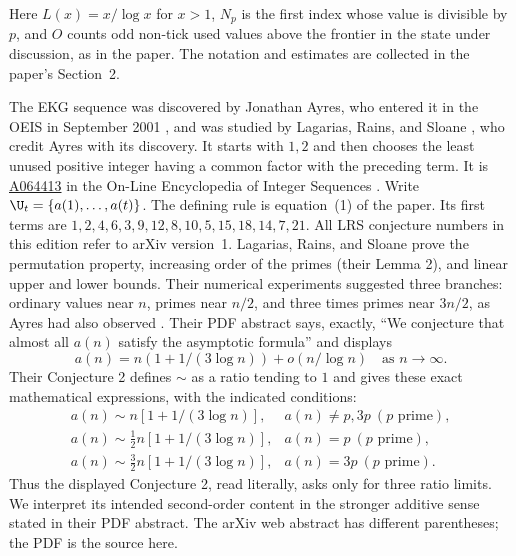 Here $L(x)=x/\log x$ for $x>1$, $N_p$ is the first index whose
value is divisible by $p$, and $O$ counts odd non-tick used values
above the frontier in the state under discussion, as in the paper.
The notation and estimates are collected in the paper's Section~2.

The EKG sequence was discovered by Jonathan Ayres, who entered it in
the OEIS in September 2001 \cite{oeis}, and was studied by
Lagarias, Rains, and Sloane \cite{lrs}, who credit Ayres with its
discovery. It starts with $1,2$ and then chooses the least unused positive
integer having a common factor with the preceding term. It is
\href{https://oeis.org/A064413}{A064413} in the On-Line Encyclopedia
of Integer Sequences \cite{oeis}. Write $\U_t=\{a(1),\ldots,a(t)\}$.
The defining rule is equation~(1) of the paper.
Its first terms are $1,2,4,6,3,9,12,8,10,5,15,18,14,7,21$.
All LRS conjecture numbers in this edition refer to arXiv version~1.
Lagarias, Rains, and Sloane prove the permutation property, increasing
order of the primes (their Lemma 2), and linear upper and lower bounds.
Their numerical experiments suggested three branches: ordinary values
near $n$, primes near $n/2$, and three times primes near $3n/2$, as Ayres
had also observed \cite[Section~4]{lrs}.
Their PDF abstract says, exactly, ``We conjecture that almost all
$a(n)$ satisfy the asymptotic formula'' and displays
\[
 a(n)=n(1+1/(3\log n))+o(n/\log n)\quad\text{as }n\to\infty.
\]
Their Conjecture 2 defines $\sim$ as a ratio tending to $1$ and gives
these exact mathematical expressions, with the indicated conditions:
\[
\begin{array}{ll}
 a(n)\sim n[1+1/(3\log n)],&a(n)\ne p,3p\ (p\text{ prime}),\\
 a(n)\sim \tfrac12 n[1+1/(3\log n)],&a(n)=p\ (p\text{ prime}),\\
 a(n)\sim \tfrac32 n[1+1/(3\log n)],&a(n)=3p\ (p\text{ prime}).
\end{array}
\]
Thus the displayed Conjecture 2, read literally, asks only for three
ratio limits. We interpret its intended second-order content in the
stronger additive sense stated in their PDF abstract. The arXiv web
abstract has different parentheses; the PDF is the source here.

